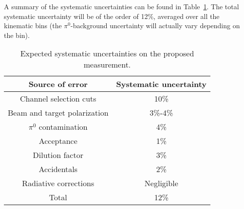A summary of the systematic uncertainties can be found in Table~\ref{table_syst}. The total systematic uncertainty will be of the order of 12\%, averaged over all the kinematic bins (the $\pi^0$-background uncertainty will actually vary depending on the bin). 

\begin{table}
\begin{center}
\begin{tabular}{|c||c|}
\hline
Source of error & Systematic uncertainty\\
\hline
Channel selection cuts & 10\% \\
\hline
Beam and target polarization & 3\%-4\%  \\
\hline
$\pi^0$ contamination & 4\%  \\
\hline
Acceptance & 1\%  \\
\hline
Dilution factor & 3\%  \\
\hline
Accidentals & 2\%  \\
\hline
Radiative corrections & Negligible  \\
\hline
\hline
Total & 12\%  \\
\hline
\end{tabular}
\caption{Expected systematic uncertainties on the proposed measurement.}
\label{table_syst}
\end{center}
\end{table}
